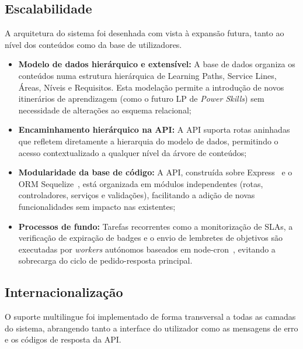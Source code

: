 \documentclass[12pt,a4paper]{report}
\begin{document}

\subsection{Escalabilidade}

A arquitetura do sistema foi desenhada com vista à expansão futura, tanto ao nível dos conteúdos como da base de utilizadores.

\begin{itemize}
  \item \textbf{Modelo de dados hierárquico e extensível:} A base de dados organiza os conteúdos numa estrutura hierárquica de Learning Paths, Service Lines, Áreas, Níveis e Requisitos. Esta modelação permite a introdução de novos itinerários de aprendizagem (como o futuro LP de \textit{Power Skills}) sem necessidade de alterações ao esquema relacional;
  \item \textbf{Encaminhamento hierárquico na API:} A API suporta rotas aninhadas que refletem diretamente a hierarquia do modelo de dados, permitindo o acesso contextualizado a qualquer nível da árvore de conteúdos;
  \item \textbf{Modularidade da base de código:} A API, construída sobre Express~\cite{expressjs} e o ORM Sequelize~\cite{sequelize}, está organizada em módulos independentes (rotas, controladores, serviços e validações), facilitando a adição de novas funcionalidades sem impacto nas existentes;
  \item \textbf{Processos de fundo:} Tarefas recorrentes como a monitorização de SLAs, a verificação de expiração de badges e o envio de lembretes de objetivos são executadas por \textit{workers} autónomos baseados em node-cron~\cite{nodecron}, evitando a sobrecarga do ciclo de pedido-resposta principal.
\end{itemize}

\subsection{Internacionalização}

O suporte multilingue foi implementado de forma transversal a todas as camadas do sistema, abrangendo tanto a interface do utilizador como as mensagens de erro e os códigos de resposta da API.
\end{document}
